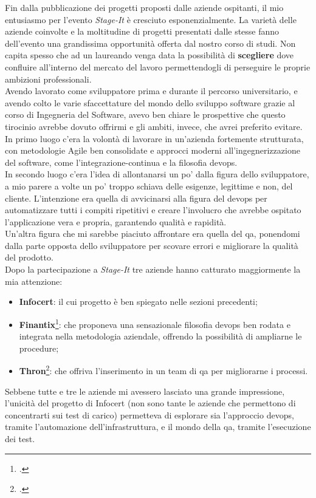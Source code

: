 Fin dalla pubblicazione dei progetti proposti dalle aziende ospitanti, il mio entusiasmo per l'evento \textit{Stage-It} è cresciuto esponenzialmente. La varietà delle aziende coinvolte e la moltitudine di progetti presentati dalle stesse fanno dell'evento una grandissima opportunità offerta dal nostro corso di studi. Non capita spesso che ad un laureando venga data la possibilità di \textbf{scegliere} dove confluire all'interno del mercato del lavoro permettendogli di perseguire le proprie ambizioni professionali.\\
Avendo lavorato come sviluppatore prima e durante il percorso universitario, e avendo colto le varie sfaccettature del mondo dello sviluppo software grazie al corso di Ingegneria del Software, avevo ben chiare le prospettive che questo tirocinio avrebbe dovuto offrirmi e gli ambiti, invece, che avrei preferito evitare. \\
In primo luogo c'era la volontà di lavorare in un'azienda fortemente strutturata, con metodologie Agile ben consolidate e approcci moderni all'ingegnerizzazione del software, come l'\gls{integrazione-continua} e la filosofia \gls{devops}.\\
In secondo luogo c'era l'idea di allontanarsi un po' dalla figura dello sviluppatore, a mio parere a volte un po' troppo schiava delle esigenze, legittime e non, del cliente. L'intenzione era quella di avvicinarsi alla figura del \gls{devops} per automatizzare tutti i compiti ripetitivi e creare l'involucro che avrebbe ospitato l'applicazione vera e propria, garantendo qualità e rapidità.\\
Un'altra figura che mi sarebbe piaciuto affrontare era quella del \gls{qa}, ponendomi dalla parte opposta dello sviluppatore per scovare errori e migliorare la qualità del prodotto. \\
Dopo la partecipazione a \textit{Stage-It} tre aziende hanno catturato maggiormente la mia attenzione: 
\begin{itemize}
	\item \textbf{Infocert}: il cui progetto è ben spiegato nelle sezioni precedenti;
	\item \textbf{Finantix}\footcite{site:finantix}: che proponeva una sensazionale filosofia \gls{devops} ben rodata e integrata nella metodologia aziendale, offrendo la possibilità di ampliarne le procedure;
	\item \textbf{Thron}\footcite{site:thron}: che offriva l'inserimento in un team di \gls{qa} per migliorarne i processi.
\end{itemize}
Sebbene tutte e tre le aziende mi avessero lasciato una grande impressione, l'unicità del progetto di Infocert (non sono tante le aziende che permettono di concentrarti sui test di carico) permetteva di esplorare sia l'approccio \gls{devops}, tramite l'automazione dell'infrastruttura, e il mondo della \gls{qa}, tramite l'esecuzione dei test.
